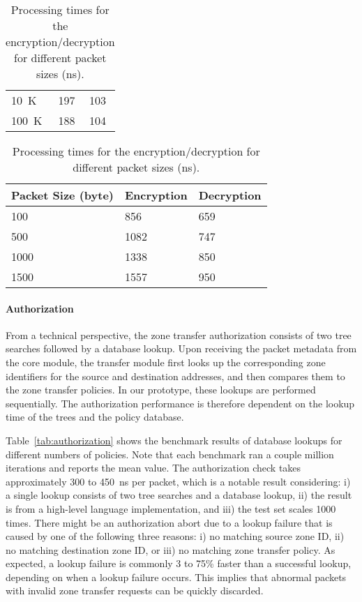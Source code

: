 \begin{table}[htb]
\begin{minipage}{.47\linewidth}
\begin{tabularx}{1\linewidth}{X|XX}
			\SI{10}{K}     & 197           & 103           \\	%
			\SI{100}{K}    & 188           & 104           \\	%
			\bottomrule
		\end{tabularx}
	\end{minipage}\hspace{2em}
	\begin{minipage}{.47\linewidth}
		\caption{Processing times for the encryption/decryption for different packet sizes (ns).}
		\label{tab:authentication}
		\begin{tabularx}{1\linewidth}{X|XX}
			\toprule
			Packet Size (byte) & Encryption & Decryption \\
			\midrule
			100                & 856        & 659        \\
			500                & 1082       & 747        \\
			1000               & 1338       & 850        \\
			1500               & 1557       & 950        \\
			\bottomrule
		\end{tabularx}
	\end{minipage}
\end{table}

\paragraph{Authorization}
From a technical perspective, the zone transfer authorization consists of two tree searches followed
by a database lookup.
Upon receiving the packet metadata from the core module, the transfer module first looks
up the corresponding zone identifiers for the source and destination addresses, and then
compares them to the zone transfer policies. In our prototype, these lookups are performed sequentially.
The authorization performance is therefore dependent on the lookup time of the trees and the policy database.

Table~\ref{tab:authorization} shows the benchmark results of database lookups
for different numbers of policies. Note that each benchmark ran a couple million
iterations and reports the mean value. The authorization check takes
approximately 300 to \SI{450}{ns} per packet, which is a notable result
considering: i) a single lookup consists of two tree searches and a database
lookup, ii) the result is from a high-level language implementation, and iii)
the test set scales 1000 times. There might be an authorization abort due to a
lookup failure that is caused by one of the following three reasons: i) no
matching source zone ID, ii) no matching destination zone ID, or iii) no matching zone transfer policy.
As expected, a lookup failure is commonly 3 to 75\% faster than a successful
lookup, depending on when a lookup failure occurs. This implies that abnormal
packets with invalid zone transfer requests can be quickly discarded.


